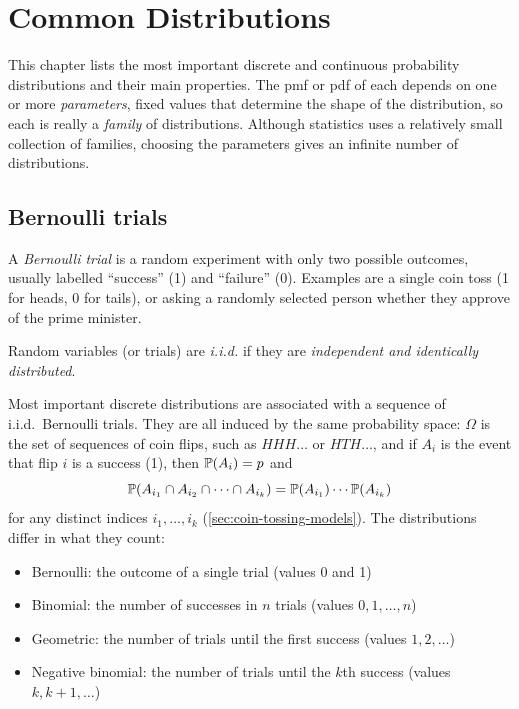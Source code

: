 \chapter{Common Distributions}\label{ch:common-distributions}



This chapter lists the most important discrete and continuous probability distributions and their main properties. The pmf or pdf of each depends on one or more \emph{parameters}, fixed values that determine the shape of the distribution, so each is really a \emph{family} of distributions. Although statistics uses a relatively small collection of families, choosing the parameters gives an infinite number of distributions.

\section{Bernoulli trials}\label{sec:bernoulli-trials}

A \emph{Bernoulli trial} is a random experiment with only two possible outcomes, usually labelled ``success'' (1) and ``failure'' (0). Examples are a single coin toss (1 for heads, 0 for tails), or asking a randomly selected person whether they approve of the prime minister.

\begin{definition}[i.i.d.]\label{def:iid}
Random variables (or trials) are \emph{i.i.d.} if they are \emph{independent and identically distributed}.
\end{definition}

Most important discrete distributions are associated with a sequence of i.i.d.\ Bernoulli trials. They are all induced by the same probability space: $\Omega$ is the set of sequences of coin flips, such as $HHH\ldots$ or $HTH\ldots$, and if $A_i$ is the event that flip $i$ is a success (1), then $\mathbb{P}(A_i) = p$ and
\[
  \mathbb{P}(A_{i_1} \cap A_{i_2} \cap \cdots \cap A_{i_k}) = \mathbb{P}(A_{i_1}) \cdots \mathbb{P}(A_{i_k})
\]
for any distinct indices $i_1, \ldots, i_k$ (\cref{sec:coin-tossing-models}). The distributions differ in what they count:
\begin{itemize}
  \item Bernoulli: the outcome of a single trial (values 0 and 1)
  \item Binomial: the number of successes in $n$ trials (values $0, 1, \ldots, n$)
  \item Geometric: the number of trials until the first success (values $1, 2, \ldots$)
  \item Negative binomial: the number of trials until the $k$th success (values $k, k+1, \ldots$)
\end{itemize}

